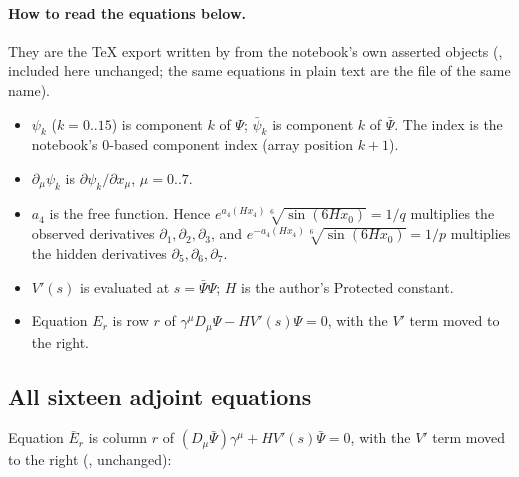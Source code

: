 \paragraph{How to read the equations below.} They are the TeX export written by
 from the notebook's own asserted objects
(, included here unchanged; the
same equations in plain text are the  file of the same name).
\begin{itemize}
  \item $\psi_k$ ($k=0..15$) is component $k$ of $\Psi$; $\bar\psi_k$ is component $k$ of $\bar\Psi$.
        The index is the notebook's 0-based component index (array position $k+1$).
  \item $\partial_\mu\psi_k$ is $\partial\psi_k/\partial x_\mu$, $\mu=0..7$.
  \item $a_4$ is the free function. Hence $e^{a_4(Hx_4)}\sqrt[6]{\sin(6Hx_0)}=1/q$ multiplies the
        observed derivatives $\partial_1,\partial_2,\partial_3$, and
        $e^{-a_4(Hx_4)}\sqrt[6]{\sin(6Hx_0)}=1/p$ multiplies the hidden derivatives
        $\partial_5,\partial_6,\partial_7$.
  \item $V'(s)$ is evaluated at $s=\bar\Psi\Psi$; $H$ is the author's Protected constant.
  \item Equation $E_r$ is row $r$ of $\gamma^\mu D_\mu\Psi-HV'(s)\Psi=0$, with the $V'$ term moved to
        the right.
\end{itemize}

{\small

}

\subsection{All sixteen adjoint equations}
\label{sec:5.5}

Equation $\bar E_r$ is column $r$ of $(D_\mu\bar\Psi)\gamma^\mu+HV'(s)\bar\Psi=0$, with the $V'$ term
moved to the right (, unchanged):

{\small

}

